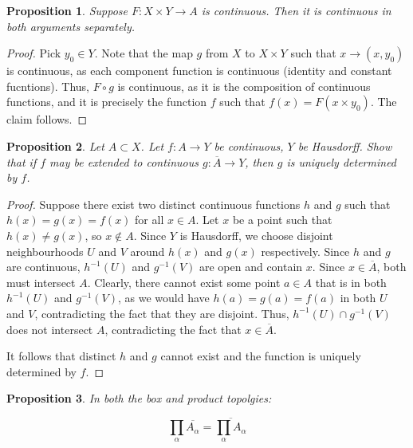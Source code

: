 \documentclass[10pt, oneside]{amsart}
\newtheorem{prop}{Proposition}
\begin{document}
    \begin{prop}
      Suppose $F : X \times Y \rightarrow A$ is continuous. Then it is continuous in both arguments separately.
    \end{prop}

    \begin{proof}
      Pick $y_0 \in Y$. Note that the map $g$ from $X$ to $X \times Y$ such that $x \rightarrow (x, y_0)$ is continuous, as each component function is continuous (identity and constant fucntions). Thus, $F \circ g$ is continuous,
      as it is the composition of continuous functions, and it is precisely the function $f$ such that $f(x) = F(x \times y_0)$. The claim follows.
      \end{proof}

    \begin{prop}
      Let $A \subset X$. Let $f : A \rightarrow Y$ be continuous, $Y$ be Hausdorff. Show that if $f$ may be extended to continuous $g : \overline{A} \rightarrow Y$, then $g$ is uniquely determined by $f$.
    \end{prop}

    \begin{proof}
      Suppose there exist two distinct continuous functions $h$ and $g$ such that $h(x) = g(x) = f(x)$ for all $x \in A$. Let $x$ be a point such that $h(x) \neq g(x)$, so $x \notin A$. Since $Y$ is Hausdorff,
      we choose disjoint neighbourhoods $U$ and $V$ around $h(x)$ and $g(x)$ respectively. Since $h$ and $g$ are continuous, $h^{-1}(U)$ and $g^{-1}(V)$ are open and contain $x$. Since $x \in \overline{A}$, both must intersect $A$.
      Clearly, there cannot exist some point $a \in A$ that is in both $h^{-1}(U)$ and $g^{-1}(V)$, as we would have $h(a) = g(a) = f(a)$ in both $U$ and $V$, contradicting the fact that they are disjoint. Thus, $h^{-1}(U) \cap g^{-1}(V)$ does not intersect $A$,
      contradicting the fact that $x \in \overline{A}$.
      \newline

      It follows that distinct $h$ and $g$ cannot exist and the function is uniquely determined by $f$.
    \end{proof}

    \begin{prop}
      In both the box and product topolgies:

      $$\displaystyle\prod_{\alpha} \overline{A_\alpha} = \overline{\displaystyle\prod_{\alpha} A_{\alpha}}$$
    \end{prop}
\end{document}
